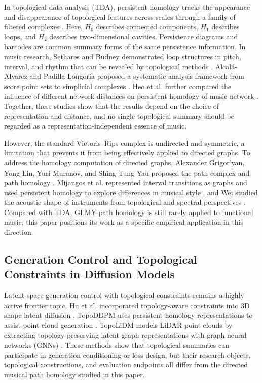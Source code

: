 \documentclass{article}
\begin{document}
In topological data analysis (TDA), persistent homology tracks the appearance and disappearance of topological features across scales through a family of filtered complexes \cite{Edelsbrunner2002}. Here, $H_0$ describes connected components, $H_1$ describes loops, and $H_2$ describes two-dimensional cavities. Persistence diagrams \cite{David2007} and barcodes \cite{Carlsson2004} are common summary forms of the same persistence information. In music research, Sethares and Budney demonstrated loop structures in pitch, interval, and rhythm that can be revealed by topological methods \cite{Sethares_2014}. Alcal\'a-Alvarez and Padilla-Longoria proposed a systematic analysis framework from score point sets to simplicial complexes \cite{Alberto2024}. Heo et al. further compared the influence of different network distances on persistent homology of music network \cite{Heo_2025}. Together, these studies show that the results depend on the choice of representation and distance, and no single topological summary should be regarded as a representation-independent essence of music.

However, the standard Vietoris--Rips complex is undirected and symmetric, a limitation that prevents it from being effectively applied to directed graphs. To address the homology computation of directed graphs, Alexander Grigor'yan, Yong Lin, Yuri Muranov, and Shing-Tung Yau proposed the path complex and path homology \cite{glmy2013, glmy2020}. Mijangos et al. represented interval transitions as graphs and used persistent homology to explore differences in musical style \cite{Martin2022}, and Wei studied the acoustic shape of instruments from topological and spectral perspectives \cite{Wei2024}. Compared with TDA, GLMY path homology is still rarely applied to functional music, this paper positions its work as a specific empirical application in this direction.

\subsection{Generation Control and Topological Constraints in Diffusion Models}

Latent-space generation control with topological constraints remains a highly active frontier topic. Hu et al. incorporated topology-aware constraints into 3D shape latent diffusion \cite{hu2024topologyawarelatentdiffusion3d}. TopoDDPM uses persistent homology representations to assist point cloud generation \cite{DU2026109240}. TopoLiDM models LiDAR point clouds by extracting topology-preserving latent graph representations with graph neural networks (GNNs) \cite{liu2025topolidmtopologyawarelidardiffusion}. These methods show that topological summaries can participate in generation conditioning or loss design, but their research objects, topological constructions, and evaluation endpoints all differ from the directed musical path homology studied in this paper.
\end{document}
